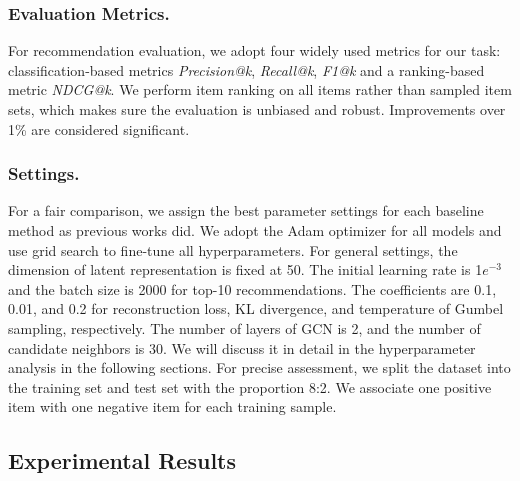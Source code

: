 \documentclass[letterpaper]{article} %
\begin{document}
\subsubsection{Evaluation Metrics.}
For recommendation evaluation, we adopt four widely used metrics for our task: classification-based metrics \textit{Precision@k}, \textit{Recall@k}, \textit{F1@k} and a ranking-based metric \textit{NDCG@k}. We perform item ranking on all items rather than sampled item sets, which makes sure the evaluation is unbiased and robust. Improvements over 1\% are considered significant.

\subsubsection{Settings.}
For a fair comparison, we assign the best parameter settings for each baseline method as previous works did. We adopt the Adam optimizer for all models and use grid search to fine-tune all hyperparameters. For general settings, the dimension of latent representation is fixed at 50. The initial learning rate is 1$e^{-3}$ and the batch size is 2000 for top-10 recommendations. The coefficients are 0.1, 0.01, and 0.2 for reconstruction loss, KL divergence, and temperature of Gumbel sampling, respectively. The number of layers of GCN is 2, and the number of candidate neighbors is 30. We will discuss it in detail in the hyperparameter analysis in the following sections. For precise assessment, we split the dataset into the training set and test set with the proportion 8:2. We associate one positive item with one negative item for each training sample.

\subsection{Experimental Results}
\end{document}

